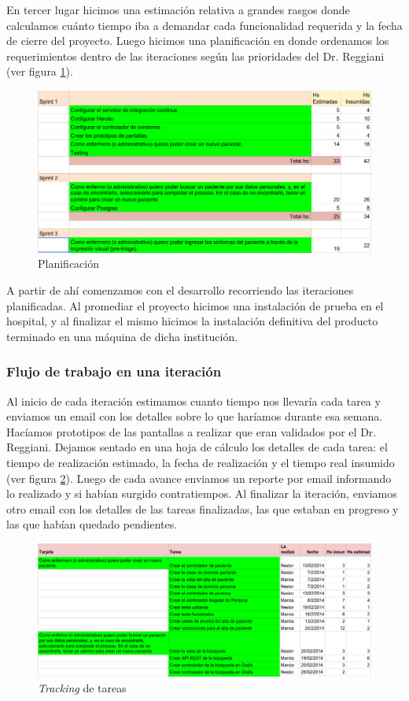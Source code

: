 En tercer lugar hicimos una estimación relativa a grandes rasgos donde calculamos cuánto tiempo iba a demandar cada funcionalidad requerida y la fecha de cierre del proyecto. Luego hicimos una planificación en donde ordenamos los requerimientos dentro de las iteraciones según las prioridades del Dr. Reggiani (ver figura \ref{fig:planificacion}).

\begin{figure}
  \centerline{\includegraphics[width=1.2\textwidth]{planificacion.png}}
  \caption{Planificación}
  \label{fig:planificacion}
\end{figure}

A partir de ahí comenzamos con el desarrollo recorriendo las iteraciones planificadas. Al promediar el proyecto hicimos una instalación de prueba en el hospital, y al finalizar el mismo hicimos la instalación definitiva del producto terminado en una máquina de dicha institución.

\subsubsection{Flujo de trabajo en una iteración}
Al inicio de cada iteración estimamos cuanto tiempo nos llevaría cada tarea y enviamos un email con los detalles sobre lo que haríamos durante esa semana. Hacíamos prototipos de las pantallas a realizar que eran validados por el Dr. Reggiani. Dejamos sentado en una hoja de cálculo los detalles de cada tarea: el tiempo de realización estimado, la fecha de realización y el tiempo real insumido (ver figura \ref{fig:tracking}). Luego de cada avance enviamos un reporte por email informando lo realizado y si habían surgido contratiempos. Al finalizar la iteración, enviamos otro email con los detalles de las tareas finalizadas, las que estaban en progreso y las que habían quedado pendientes.

\begin{figure}
  \centerline{\includegraphics[width=1.2\textwidth]{tracking.png}}
  \caption{\textit{Tracking} de tareas}
  \label{fig:tracking}
\end{figure}

